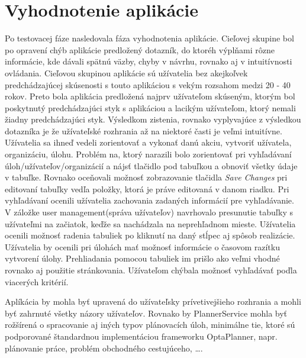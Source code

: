 \section{Vyhodnotenie aplikácie}
Po testovacej fáze nasledovala fáza vyhodnotenia aplikácie. Cieľovej skupine bol po opravení chýb aplikácie predložený dotazník, do ktoréh výplňami rôzne informácie, kde dávali spätnú väzby, chyby v návrhu, rovnako aj v intuitívnosti ovládania. Cieľovou skupinou aplikácie sú užívatelia bez akejkoľvek predchádzajúcej skúsenosti s touto aplikáciou s vekým rozsahom medzi 20 - 40 rokov. Preto bola aplikácia predložená najprv užívateľom skúseným, ktorým bol poskytnutý predchádzajúci styk s aplikáciou a lacikým užívateľom, ktorý nemali žiadny predchádzajúci styk. Výsledkom zistenia, rovnako vyplyvajúce z výsledkou dotazníka je že užívateľské rozhrania až na niektoré časti je veľmi intuitívne. Užívatelia sa ihneď vedeli zorientovať a vykonať danú akciu, vytvoriť užívatela, organizáciu, úlohu. Problém na, ktorý narazili bolo zorientovať pri vyhľadávaní úloh/užívateľov/organizácií a nájsť tlačidlo pod tabuľkou  a obnoviť všetky údaje v tabuľke. Rovnako oceňovali možnosť zobrazovanie tlačidla \emph{Save Changes} pri editovaní tabuľky vedľa položky, ktorá je práve editovaná v danom riadku. Pri vyhľadávaní ocenili užívatelia zachovania zadaných informácií pre vyhľadávanie. V záložke user management(správa užívateľov) navrhovalo presunutie tabuľky s užívateľmi na začiatok, keďže sa nachádzala na neprehľadnom mieste. Užívatelia ocenili možnosť radenia tabuliek po kliknutí na daný stĺpec aj spôsob realizácie. Užívatelia by ocenili pri úlohách mať možnosť informácie o časovom razítku vytvorení úlohy. Prehliadania pomocou tabuliek im prišlo ako veľmi vhodné rovnako aj použitie stránkovania. Užívateľom chýbala možnosť vyhľadávať poďla viacerých kritérií.



Aplíkácia by mohla byť upravená do užívateľsky prívetivejšieho rozhrania a mohli byť zahrnuté všetky názory užívateľov. Rovnako by PlannerService mohla byť rožšírená o spracovanie aj iných typov plánovacích úloh, minimálne tie, ktoré sú podporované štandardnou implementáciou frameworku OptaPlanner, napr. plánovanie práce, problém obchodného cestujúceho, \ldots.



